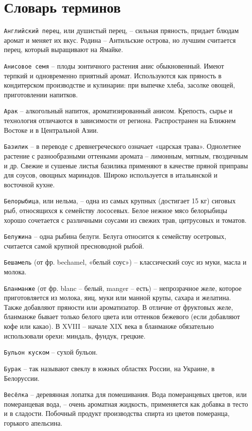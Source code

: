 \section*{Словарь терминов}

{\tt Английский перец}, или душистый перец, – сильная пряность, придает блюдам аромат и меняет их вкус. Родина – Антильские острова, но лучшим считается перец, который выращивают на Ямайке.

{\tt Анисовое семя} – плоды зонтичного растения анис обыкновенный. Имеют терпкий и одновременно приятный аромат. Используются как пряность в кондитерском производстве и кулинарии: при выпечке хлеба, засолке овощей, приготовлении напитков.

{\tt Арак} – алкогольный напиток, ароматизированный анисом. Крепость, сырье и технология отличаются в зависимости от региона. Распространен на Ближнем Востоке и в Центральной Азии.

{\tt Базилик} – в переводе с древнегреческого означает «царская трава». Однолетнее растение с разнообразными оттенками аромата – лимонным, мятным, гвоздичным и др. Свежие и сушеные листья базилика применяют в качестве пряной приправы для соусов, овощных маринадов. Широко используется в итальянской и восточной кухне.

{\tt Белорыбица}, или нельма, – одна из самых крупных (достигает 15 кг) сиговых рыб, относящихся к семейству лососевых. Белое нежное мясо белорыбицы хорошо сочетается с различными соусами из свежих трав, цитрусовых и томатов. 

{\tt Белужина} – одна рыбина белуги. Белуга относится к семейству осетровых, считается самой крупной пресноводной рыбой.

{\tt Бешамель} (от фр. bechamel, «белый соус») – классический соус из муки, масла и молока.

{\tt Бланманже} (от фр. blanc – белый, manger – есть) – непрозрачное желе, которое приготовляется из молока, яиц, муки или манной крупы, сахара и желатина. Также добавляют пряности или ароматизатор. В отличие от фруктовых желе, бланманже бывает только белого цвета или оттенков бежевого (если добавляют кофе или какао). В XVIII – начале XIX века в бланманже обязательно использовали орехи: миндаль, фундук, грецкие.

{\tt Бульон куском} – сухой бульон.

{\tt Бурак} – так называют свеклу в южных областях России, на Украине, в Белоруссии.

{\tt Весёлка} – деревянная лопатка для помешивания. Вода померанцевых цветов, или померанцевая вода, – очень ароматная жидкость, применяется как добавка в тесто и в сладости. Побочный продукт производства спирта из цветов померанца, горького апельсина. 

